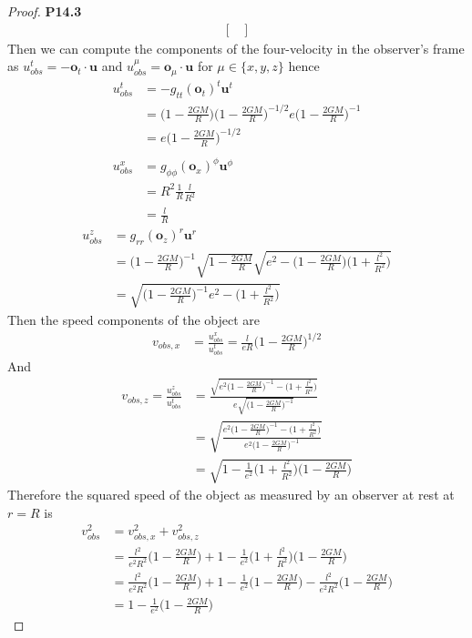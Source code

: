 \documentclass[11pt]{article}
\theoremstyle{definition}
\begin{document}
\begin{proof}{\textbf{P14.3}}
\begin{align*}
\begin{bmatrix}
    \end{bmatrix}
\end{align*}
Then we can compute the components of the four-velocity in the observer's frame
as $u_{obs}^t = -\bm{o}_t\cdot \bm{u}$ and $u_{obs}^\mu = \bm{o}_\mu\cdot \bm{u}$
for $\mu \in \{x, y, z\}$ hence
\begin{align*}
    u_{obs}^t &= -g_{tt}(\bm{o}_t)^t \bm{u}^t\\
    &= \bigg(1 - \frac{2GM}{R}\bigg)\bigg(1 - \frac{2GM}{R}\bigg)^{-1/2}
    e\bigg(1 - \frac{2GM}{R}\bigg)^{-1}\\
    &= e\bigg(1 - \frac{2GM}{R}\bigg)^{-1/2}\\
    \\
    u_{obs}^x &= g_{\phi\phi}(\bm{o}_x)^\phi \bm{u}^\phi\\
    &= R^2\frac{1}{R}\frac{l}{R^2}\\
    &= \frac{l}{R}
\end{align*}
\begin{align*}
    u_{obs}^z &= g_{rr}(\bm{o}_z)^r \bm{u}^r\\
    &=\bigg(1 - \frac{2GM}{R}\bigg)^{-1}\sqrt{1 - \frac{2GM}{R}}
    \sqrt{e^2 - \bigg(1 - \frac{2GM}{R}\bigg)\bigg(1 + \frac{l^2}{R^2}\bigg)}\\
    &=\sqrt{\bigg(1 - \frac{2GM}{R}\bigg)^{-1}e^2 - \bigg(1 + \frac{l^2}{R^2}\bigg)}
\end{align*}
Then the speed components of the object are
\begin{align*}
    v_{obs,x} &= \frac{u_{obs}^x}{u_{obs}^t} 
    = \frac{l}{eR}\bigg(1 - \frac{2GM}{R}\bigg)^{1/2}
\end{align*}
And
\begin{align*}
    v_{obs,z} = \frac{u_{obs}^z}{u_{obs}^t} 
    &= \frac{
    \sqrt{e^2\bigg(1 - \frac{2GM}{R}\bigg)^{-1} - \bigg(1 + \frac{l^2}{R^2}\bigg)}}
    {e\sqrt{\bigg(1 - \frac{2GM}{R}\bigg)^{-1}}}\\
    &= \sqrt{\frac{
    e^2\bigg(1 - \frac{2GM}{R}\bigg)^{-1} - \bigg(1 + \frac{l^2}{R^2}\bigg)
    }{e^2\bigg(1 - \frac{2GM}{R}\bigg)^{-1}}}\\
    &= \sqrt{1 -
    \frac{1}{e^2}\bigg(1 + \frac{l^2}{R^2}\bigg)\bigg(1 - \frac{2GM}{R}\bigg)}
\end{align*}
Therefore the squared speed of the object as measured by an observer at rest at
$r = R$ is
\begin{align*}
    v_{obs}^2 &= v_{obs,x}^2 + v_{obs,z}^2\\
    &= \frac{l^2}{e^2R^2}\bigg(1 - \frac{2GM}{R}\bigg) + 1
    - \frac{1}{e^2}\bigg(1 + \frac{l^2}{R^2}\bigg)\bigg(1 - \frac{2GM}{R}\bigg)\\
    &= \frac{l^2}{e^2R^2}\bigg(1 - \frac{2GM}{R}\bigg) + 1
    - \frac{1}{e^2}\bigg(1 - \frac{2GM}{R}\bigg)
    - \frac{l^2}{e^2R^2}\bigg(1 - \frac{2GM}{R}\bigg)\\
    &= 1 - \frac{1}{e^2}\bigg(1 - \frac{2GM}{R}\bigg)
\end{align*}
\end{proof}
\end{document}

